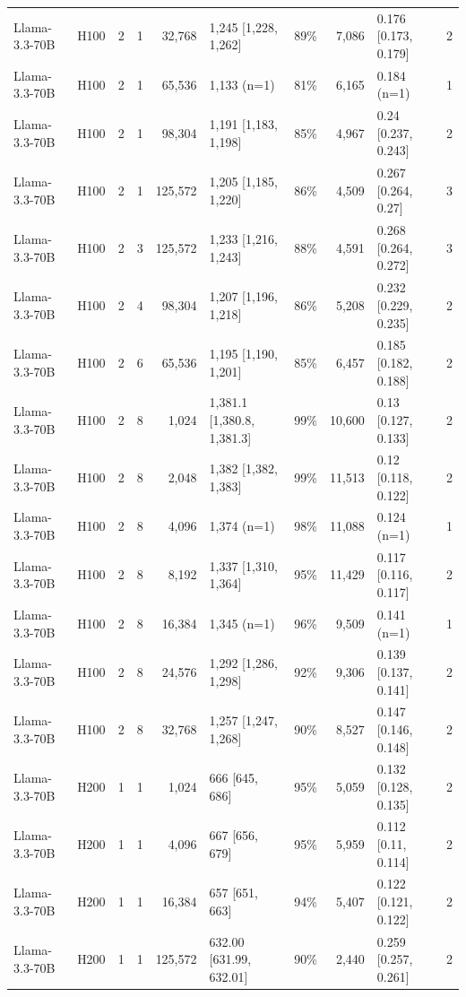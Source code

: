 \begin{landscape}
\begin{longtable}{llrrrlrrlr}
Llama-3.3-70B & H100 & 2 & 1 & 32,768 & 1,245 {[}1,228, 1,262{]} & 89\% & 7,086 & 0.176 {[}0.173, 0.179{]} & 2 \\
Llama-3.3-70B & H100 & 2 & 1 & 65,536 & 1,133 (n=1) & 81\% & 6,165 & 0.184 (n=1) & 1 \\
Llama-3.3-70B & H100 & 2 & 1 & 98,304 & 1,191 {[}1,183, 1,198{]} & 85\% & 4,967 & 0.24 {[}0.237, 0.243{]} & 2 \\
Llama-3.3-70B & H100 & 2 & 1 & 125,572 & 1,205 {[}1,185, 1,220{]} & 86\% & 4,509 & 0.267 {[}0.264, 0.27{]} & 3 \\
Llama-3.3-70B & H100 & 2 & 3 & 125,572 & 1,233 {[}1,216, 1,243{]} & 88\% & 4,591 & 0.268 {[}0.264, 0.272{]} & 3 \\
Llama-3.3-70B & H100 & 2 & 4 & 98,304 & 1,207 {[}1,196, 1,218{]} & 86\% & 5,208 & 0.232 {[}0.229, 0.235{]} & 2 \\
Llama-3.3-70B & H100 & 2 & 6 & 65,536 & 1,195 {[}1,190, 1,201{]} & 85\% & 6,457 & 0.185 {[}0.182, 0.188{]} & 2 \\
Llama-3.3-70B & H100 & 2 & 8 & 1,024 & 1,381.1 {[}1,380.8, 1,381.3{]} & 99\% & 10,600 & 0.13 {[}0.127, 0.133{]} & 2 \\
Llama-3.3-70B & H100 & 2 & 8 & 2,048 & 1,382 {[}1,382, 1,383{]} & 99\% & 11,513 & 0.12 {[}0.118, 0.122{]} & 2 \\
Llama-3.3-70B & H100 & 2 & 8 & 4,096 & 1,374 (n=1) & 98\% & 11,088 & 0.124 (n=1) & 1 \\
Llama-3.3-70B & H100 & 2 & 8 & 8,192 & 1,337 {[}1,310, 1,364{]} & 95\% & 11,429 & 0.117 {[}0.116, 0.117{]} & 2 \\
Llama-3.3-70B & H100 & 2 & 8 & 16,384 & 1,345 (n=1) & 96\% & 9,509 & 0.141 (n=1) & 1 \\
Llama-3.3-70B & H100 & 2 & 8 & 24,576 & 1,292 {[}1,286, 1,298{]} & 92\% & 9,306 & 0.139 {[}0.137, 0.141{]} & 2 \\
Llama-3.3-70B & H100 & 2 & 8 & 32,768 & 1,257 {[}1,247, 1,268{]} & 90\% & 8,527 & 0.147 {[}0.146, 0.148{]} & 2 \\
Llama-3.3-70B & H200 & 1 & 1 & 1,024 & 666 {[}645, 686{]} & 95\% & 5,059 & 0.132 {[}0.128, 0.135{]} & 2 \\
Llama-3.3-70B & H200 & 1 & 1 & 4,096 & 667 {[}656, 679{]} & 95\% & 5,959 & 0.112 {[}0.11, 0.114{]} & 2 \\
Llama-3.3-70B & H200 & 1 & 1 & 16,384 & 657 {[}651, 663{]} & 94\% & 5,407 & 0.122 {[}0.121, 0.122{]} & 2 \\
Llama-3.3-70B & H200 & 1 & 1 & 125,572 & 632.00 {[}631.99, 632.01{]} & 90\% & 2,440 & 0.259 {[}0.257, 0.261{]} & 2 \\

\end{longtable}
\end{landscape}
